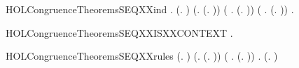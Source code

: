 \newcommand{\HOLCongruenceTheoremsSEQXXcombin}{\UseVerbatim{HOLCongruenceTheoremsSEQXXcombin}}
\begin{SaveVerbatim}{HOLCongruenceTheoremsSEQXXind}
\HOLTokenTurnstile{} \HOLSymConst{\HOLTokenForall{}}.
        (\HOLTokenLambda{}. ) \HOLSymConst{\HOLTokenConj{}} (\HOLSymConst{\HOLTokenForall{}}.  (\HOLTokenLambda{}. )) \HOLSymConst{\HOLTokenConj{}}
       (\HOLSymConst{\HOLTokenForall{}} .   \HOLSymConst{\HOLTokenImp{}}  (\HOLTokenLambda{}.  )) \HOLSymConst{\HOLTokenConj{}}
       (\HOLSymConst{\HOLTokenForall{}} .   \HOLSymConst{\HOLTokenConj{}}   \HOLSymConst{\HOLTokenImp{}}  (\HOLTokenLambda{}.   \HOLSymConst{+}  )) \HOLSymConst{\HOLTokenImp{}}
       \HOLSymConst{\HOLTokenForall{}}.   \HOLSymConst{\HOLTokenImp{}}  
\end{SaveVerbatim}
\newcommand{\HOLCongruenceTheoremsSEQXXind}{\UseVerbatim{HOLCongruenceTheoremsSEQXXind}}
\begin{SaveVerbatim}{HOLCongruenceTheoremsSEQXXISXXCONTEXT}
\HOLTokenTurnstile{} \HOLSymConst{\HOLTokenForall{}}.   \HOLSymConst{\HOLTokenImp{}}  
\end{SaveVerbatim}
\newcommand{\HOLCongruenceTheoremsSEQXXISXXCONTEXT}{\UseVerbatim{HOLCongruenceTheoremsSEQXXISXXCONTEXT}}
\begin{SaveVerbatim}{HOLCongruenceTheoremsSEQXXrules}
\HOLTokenTurnstile{}  (\HOLTokenLambda{}. ) \HOLSymConst{\HOLTokenConj{}} (\HOLSymConst{\HOLTokenForall{}}.  (\HOLTokenLambda{}. )) \HOLSymConst{\HOLTokenConj{}}
   (\HOLSymConst{\HOLTokenForall{}} .   \HOLSymConst{\HOLTokenImp{}}  (\HOLTokenLambda{}.  )) \HOLSymConst{\HOLTokenConj{}}
   \HOLSymConst{\HOLTokenForall{}} .   \HOLSymConst{\HOLTokenConj{}}   \HOLSymConst{\HOLTokenImp{}}  (\HOLTokenLambda{}.   \HOLSymConst{+}  )
\end{SaveVerbatim}
